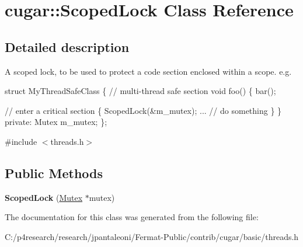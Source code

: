\hypertarget{classcugar_1_1_scoped_lock}{}\section{cugar\+:\+:Scoped\+Lock Class Reference}
\label{classcugar_1_1_scoped_lock}


\subsection{Detailed description}
A scoped lock, to be used to protect a code section enclosed within a scope. e.\+g.


\begin{DoxyCode}
\textcolor{keyword}{struct }MyThreadSafeClass
\{
    \textcolor{comment}{// multi-thread safe section}
    \textcolor{keywordtype}{void} foo()
    \{
       bar();

       \textcolor{comment}{// enter a critical section}
       \{
           ScopedLock(&m\_mutex);
           ... \textcolor{comment}{// do something}
       \}
    \}
\textcolor{keyword}{private}:
    Mutex m\_mutex;
\};
\end{DoxyCode}
 

{\ttfamily \#include $<$threads.\+h$>$}

\subsection*{Public Methods}
\begin{DoxyCompactItemize}
\item 
\mbox{\label{classcugar_1_1_scoped_lock_a0a1da934a28160b46abde9932691bd3e}} 
{\bfseries Scoped\+Lock} (\hyperlink{classcugar_1_1_mutex}{Mutex} $\ast$mutex)
\end{DoxyCompactItemize}


The documentation for this class was generated from the following file\+:\begin{DoxyCompactItemize}
\item 
C\+:/p4research/research/jpantaleoni/\+Fermat-\/\+Public/contrib/cugar/basic/threads.\+h\end{DoxyCompactItemize}
